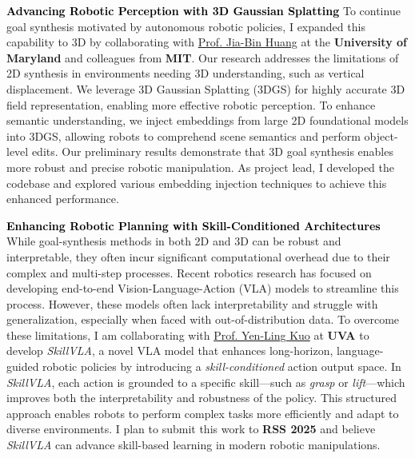 \documentclass[10pt]{article}
\newcommand{\statement}[1]{\medskip\noindent
  \textcolor{black}{\textbf{#1}}\space
}
\begin{document}
\statement{Advancing Robotic Perception with 3D Gaussian Splatting} To continue goal synthesis motivated by autonomous robotic policies, I expanded this capability to 3D by collaborating with \href{https://jbhuang0604.github.io/}{Prof. Jia-Bin Huang} at the \textbf{University of Maryland} and colleagues from \textbf{MIT}. Our research addresses the limitations of 2D synthesis in environments needing 3D understanding, such as vertical displacement. We leverage 3D Gaussian Splatting (3DGS) for highly accurate 3D field representation, enabling more effective robotic perception. To enhance semantic understanding, we inject embeddings from large 2D foundational models into 3DGS, allowing robots to comprehend scene semantics and perform object-level edits. Our preliminary results demonstrate that 3D goal synthesis enables more robust and precise robotic manipulation. As project lead, I developed the codebase and explored various embedding injection techniques to achieve this enhanced performance.

\statement{Enhancing Robotic Planning with Skill-Conditioned Architectures} While goal-synthesis methods in both 2D and 3D can be robust and interpretable, they often incur significant computational overhead due to their complex and multi-step processes. Recent robotics research has focused on developing end-to-end Vision-Language-Action (VLA) models to streamline this process. However, these models often lack interpretability and struggle with generalization, especially when faced with out-of-distribution data. To overcome these limitations, I am collaborating with \href{https://yenlingkuo.com/}{Prof. Yen-Ling Kuo} at \textbf{UVA} to develop \textit{SkillVLA}, a novel VLA model that enhances long-horizon, language-guided robotic policies by introducing a \textit{skill-conditioned} action output space. In \textit{SkillVLA}, each action is grounded to a specific skill—such as \textit{grasp} or \textit{lift}—which improves both the interpretability and robustness of the policy. This structured approach enables robots to perform complex tasks more efficiently and adapt to diverse environments. I plan to submit this work to \textbf{RSS 2025} and believe \textit{SkillVLA} can advance skill-based learning in modern robotic manipulations.
\end{document}
